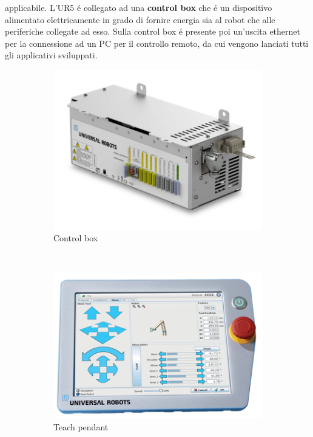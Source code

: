 applicabile.
L'UR5 \'{e} collegato ad una \textbf{control box} che \'{e} un dispositivo alimentato elettricamente 
in grado di fornire energia sia al robot che alle periferiche collegate ad esso. Sulla control box \'{e} presente poi un'uscita 
ethernet per la connessione ad un PC per il controllo remoto, da cui vengono lanciati tutti 
gli applicativi sviluppati.
\begin{figure}[H]
    \centering
    \begin{subfigure}[b]{0.4\textwidth}
        \includegraphics[width=\textwidth]{images/control-box.png}
        \caption{Control box}
        \label{fig:control-box}
    \end{subfigure}
    ~ %
    \begin{subfigure}[b]{0.4\textwidth}
        \includegraphics[width=\textwidth]{images/teach_pendant.png}
        \caption{Teach pendant}
        \label{fig:teach_pendant}
    \end{subfigure}
    \caption{}
    \label{fig:box-pendant}
\end{figure}
